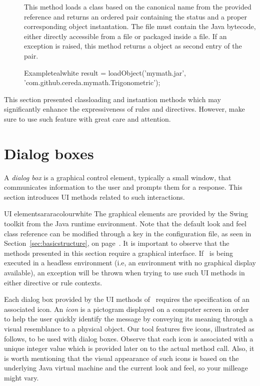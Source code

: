 \begin{description}
\item[] This method loads a class based on the canonical name from the provided  reference and returns an ordered pair containing the status and a proper corresponding object instantation. The file must contain the Java bytecode, either directly accessible from a  file or packaged inside a  file. If an exception is raised, this method returns a  object as second entry of the pair.

\begin{codebox}{Example}{teal}{\icnote}{white}
result = loadObject('mymath.jar',
         'com.github.cereda.mymath.Trigonometric');
\end{codebox}
\end{description}

This section presented classloading and instantion methods which may significantly enhance the expressiveness of rules and directives. However, make sure to use such feature with great care and attention.

\section{Dialog boxes}
\label{sec:dialogboxes}

A \emph{dialog box} is a graphical control element, typically a small window, that communicates information to the user and prompts them for a response. This section introduces UI methods related to such interactions.

\begin{messagebox}{UI elements}{araracolour}{\icok}{white}
The graphical elements are provided by the Swing toolkit from the Java runtime environment. Note that the default look and feel class reference can be modified through a key in the configuration file, as seen in Section~\ref{sec:basicstructure}, on page~\pageref{sec:basicstructure}. It is important to observe that the methods presented in this section require a graphical interface. If \arara\ is being executed in a headless environment (i.e, an environment with no graphical display available), an exception will be thrown when trying to use such UI methods in either directive or rule contexts.
\end{messagebox}

Each dialog box provided by the UI methods of \arara\ requires the specification of an associated icon. An \emph{icon} is a pictogram displayed on a computer screen in order to help the user quickly identify the message by conveying its meaning through a visual resemblance to a physical object. Our tool features five icons, illustrated as follows, to be used with dialog boxes. Observe that each icon is associated with a unique integer value which is provided later on to the actual method call. Also, it is worth mentioning that the visual appearance of such icons is based on the underlying Java virtual machine and the current look and feel, so your milleage might vary.

